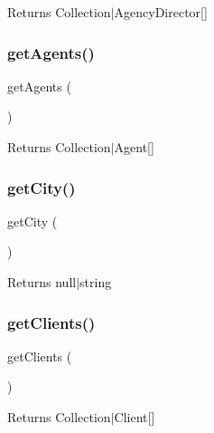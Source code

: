 \begin{DoxyReturn}{Returns}
Collection$\vert$\+Agency\+Director\mbox{[}\mbox{]} 
\end{DoxyReturn}
\mbox{\label{class_app_1_1_entity_1_1_user_af8ff8a6ad7be0182c2db92302bbde674}} 
\subsubsection{\texorpdfstring{getAgents()}{getAgents()}}
{\footnotesize\ttfamily get\+Agents (\begin{DoxyParamCaption}{ }\end{DoxyParamCaption})}

\begin{DoxyReturn}{Returns}
Collection$\vert$\+Agent\mbox{[}\mbox{]} 
\end{DoxyReturn}
\mbox{\label{class_app_1_1_entity_1_1_user_ae9ca906fce6e9fe5fab3a6b42209d6a1}} 
\subsubsection{\texorpdfstring{getCity()}{getCity()}}
{\footnotesize\ttfamily get\+City (\begin{DoxyParamCaption}{ }\end{DoxyParamCaption})}

\begin{DoxyReturn}{Returns}
null$\vert$string 
\end{DoxyReturn}
\mbox{\label{class_app_1_1_entity_1_1_user_ae4ce9d283573b2488e049b575c326547}} 
\subsubsection{\texorpdfstring{getClients()}{getClients()}}
{\footnotesize\ttfamily get\+Clients (\begin{DoxyParamCaption}{ }\end{DoxyParamCaption})}

\begin{DoxyReturn}{Returns}
Collection$\vert$\+Client\mbox{[}\mbox{]} 
\end{DoxyReturn}
\mbox{\label{class_app_1_1_entity_1_1_user_a02a01849f28e2535e888ae4ec87b20f2}} 
